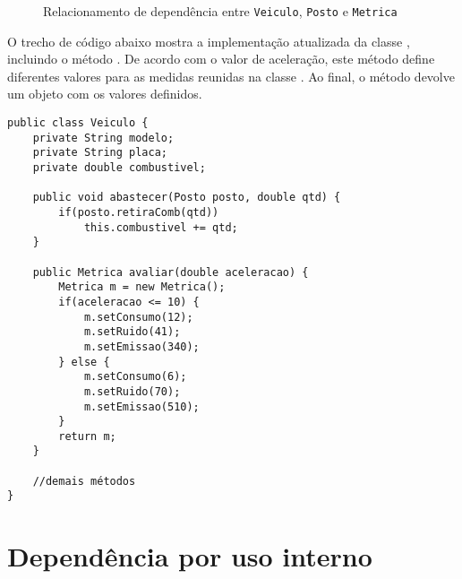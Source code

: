 \begin{figure}[h]
	\centering
	
	
	\caption{Relacionamento de dependência entre \texttt{Veiculo}, \texttt{Posto} e \texttt{Metrica}}
	\label{fig:dependencia-veiculo-posto-metrica}
	\end{figure}

O trecho de código abaixo mostra a implementação atualizada da classe , incluindo o método . De acordo com o valor de aceleração, este método define diferentes valores para as medidas reunidas na classe . Ao final, o método devolve um objeto  com os valores definidos.

\begin{verbatim}
public class Veiculo {
	private String modelo;
	private String placa;
	private double combustivel;
	
	public void abastecer(Posto posto, double qtd) {
		if(posto.retiraComb(qtd))
			this.combustivel += qtd;
	}
	
	public Metrica avaliar(double aceleracao) {
		Metrica m = new Metrica();
		if(aceleracao <= 10) {
			m.setConsumo(12);
			m.setRuido(41);
			m.setEmissao(340);
		} else {
			m.setConsumo(6);
			m.setRuido(70);
			m.setEmissao(510);
		}
		return m;
	}
	
	//demais métodos
}
\end{verbatim}

\section{Dependência por uso interno}

